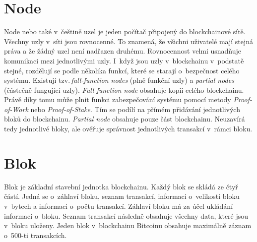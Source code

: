 \documentclass[12pt]{report}			%
\begin{document}
		\section{Node}{
Node nebo také v~češtině uzel je jeden počítač připojený do blockchainové sítě. Všechny uzly v~síti jsou rovnocenné. To znamená, že všichni uživatelé mají stejná práva a že žádný uzel není nadřazen druhému. Rovnocennost velmi usnadňuje komunikaci mezi jednotlivými uzly. I~když jsou uzly v~blockchainu v~podstatě stejné, rozdělují se podle několika funkcí, které se starají o~bezpečnost celého systému. Existují tzv.\,\textit{full-function nodes} (plně funkční uzly) a \textit{partial nodes} (částečně fungující uzly). \textit{Full-function node} obsahuje kopii celého blockchainu. Právě díky tomu může plnit funkci zabezpečování systému pomocí metody \textit{Proof-of-Work} nebo \textit{Proof-of-Stake}. Tím se podílí na přímém přidávání jednotlivých bloků do blockchainu. \textit{Partial node} obsahuje pouze část blockchainu. Neuzavírá tedy jednotlivé bloky, ale ověřuje správnost jednotlivých transakcí v~rámci bloku.		
\cite{Abrol2022}} \cite{introduction}
		\section{Blok}{
Blok je základní stavební jednotka blockchainu. Každý blok se skládá ze čtyř částí. Jedná se o~záhlaví bloku, seznam transakcí, informaci o~velikosti bloku v~bytech a informaci o~počtu transakcí. Záhlaví bloku má za účel ukládání informací o~bloku. Seznam transakcí následně obsahuje všechny data, které jsou v~bloku uloženy. Jeden blok v~blockchainu Bitcoinu obsahuje maximálně záznam o~500-ti transakcích.  \cite{Antonopoulos2017}
}
\end{document}
